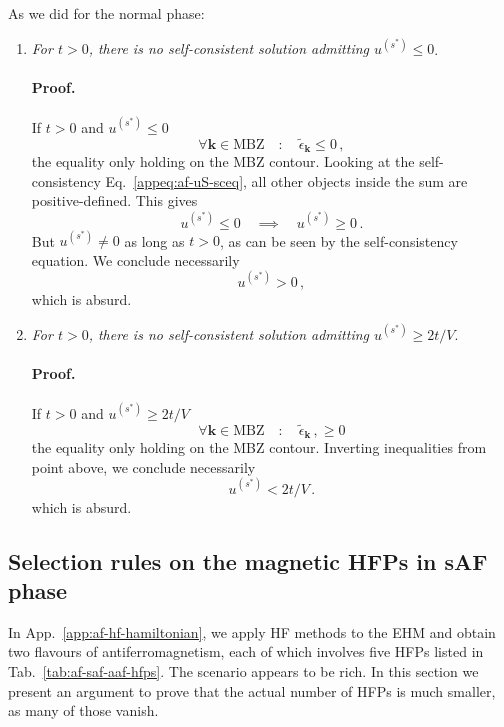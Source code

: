\begin{tabproof}

As we did for the normal phase:
\begin{enumerate}
	
	\item \textit{For $t>0$, there is no self-consistent solution admitting $u^{(s^*)}\le0$}. 
	
	\paragraph{Proof.}
	
	If $t>0$ and $u^{(s^*)} \le 0$
	\[
		\forall \mathbf{k} \in \mathrm{MBZ}
		\quad\colon\quad
		\tilde{\epsilon}_\mathbf{k} \le 0 \, ,
	\]
	the equality only holding on the MBZ contour. Looking at the self-consistency Eq.~\eqref{appeq:af-uS-sceq}, all other objects inside the sum are positive-defined. This gives
	\[
		u^{(s^*)} \le 0
		\quad\implies\quad
		u^{(s^*)} \ge 0 \, .
	\]
	But $u^{(s^*)} \neq 0$ as long as $t>0$, as can be seen by the self-consistency equation. We conclude necessarily
	\[
		u^{(s^*)} > 0 \, ,
	\]
	which is absurd.
	\item \textit{For $t>0$, there is no self-consistent solution admitting $u^{(s^*)}\ge 2t/V$}. 
	
	\paragraph{Proof.}
	
	If $t>0$ and $u^{(s^*)} \ge 2t/V$
	\[
		\forall \mathbf{k} \in \mathrm{MBZ}
		\quad\colon\quad
		\tilde{\epsilon}_\mathbf{k} \, , \ge 0
	\]
	the equality only holding on the MBZ contour. Inverting inequalities from point above, we conclude necessarily
	\[
		u^{(s^*)} < 2t/V \, .
	\]
	which is absurd.
\end{enumerate}
\end{tabproof}

\subsection{Selection rules on the magnetic HFPs in sAF phase}\label{appsubsec:af-HFPs=0-sAF}

In App.~\ref{app:af-hf-hamiltonian}, we apply HF methods to the EHM and obtain two flavours of antiferromagnetism, each of which involves five HFPs listed in Tab.~\ref{tab:af-saf-aaf-hfps}. The scenario appears to be rich. In this section we present an argument to prove that the actual number of HFPs is much smaller, as many of those vanish. 

